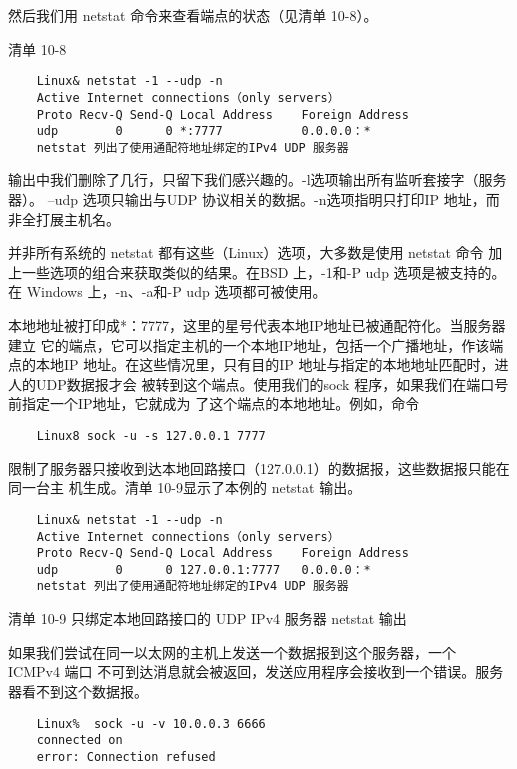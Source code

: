 然后我们用 netstat 命令来查看端点的状态（见清单 10-8）。

清单 10-8

\begin{verbatim}
    Linux& netstat -1 --udp -n
    Active Internet connections（only servers）
    Proto Recv-Q Send-Q Local Address    Foreign Address
    udp        0      0 *:7777           0.0.0.0：*
    netstat 列出了使用通配符地址绑定的IPv4 UDP 服务器
\end{verbatim}

输出中我们删除了几行，只留下我们感兴趣的。-l选项输出所有监听套接字（服务器）。
--udp 选项只输出与UDP 协议相关的数据。-n选项指明只打印IP 地址，而非全打展主机名。

\begin{tcolorbox}
    并非所有系统的 netstat 都有这些（Linux）选项，大多数是使用 netstat 命令
    加上一些选项的组合来获取类似的结果。在BSD 上，-1和-P udp 选项是被支持的。
    在 Windows 上，-n、-a和-P udp 选项都可被使用。
\end{tcolorbox}

本地地址被打印成*：7777，这里的星号代表本地IP地址已被通配符化。当服务器建立
它的端点，它可以指定主机的一个本地IP地址，包括一个广播地址，作该端点的本地IP
地址。在这些情况里，只有目的IP 地址与指定的本地地址匹配时，进人的UDP数据报才会
被转到这个端点。使用我们的sock 程序，如果我们在端口号前指定一个IP地址，它就成为
了这个端点的本地地址。例如，命令

\begin{verbatim}
    Linux8 sock -u -s 127.0.0.1 7777
\end{verbatim}

限制了服务器只接收到达本地回路接口（127.0.0.1）的数据报，这些数据报只能在同一台主
机生成。清单 10-9显示了本例的 netstat 输出。

\begin{verbatim}
    Linux& netstat -1 --udp -n
    Active Internet connections（only servers）
    Proto Recv-Q Send-Q Local Address    Foreign Address
    udp        0      0 127.0.0.1:7777   0.0.0.0：*
    netstat 列出了使用通配符地址绑定的IPv4 UDP 服务器
\end{verbatim}
清单 10-9 只绑定本地回路接口的 UDP IPv4 服务器 netstat 输出

如果我们尝试在同一以太网的主机上发送一个数据报到这个服务器，一个 ICMPv4 端口
不可到达消息就会被返回，发送应用程序会接收到一个错误。服务器看不到这个数据报。

\begin{verbatim}
    Linux%  sock -u -v 10.0.0.3 6666
    connected on
    error: Connection refused
\end{verbatim}

